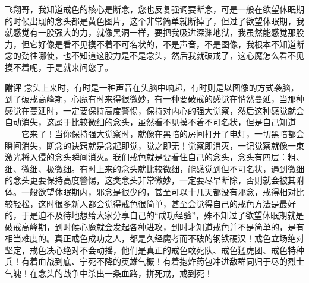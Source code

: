 \begin{case}
    飞翔哥，我知道戒色的核心是断念，您也反复强调要断念，可是一般在欲望休眠期的时候出现的念头都是黄色图片，这个非常简单就断掉了，但过了欲望休眠期，我就感觉有一股强大的力，就像黑洞一样，要把我吸进深渊地狱，我虽然能感觉那股力，但它好像是看不见摸不着不可名状的，不是声音，不是图像，我根本不知道断念的劲往哪使，也不知道这股力是不是念头，然后我就破戒了，这心魔怎么看不见摸不着呢，于是就来问您了。

    \textbf{附评} 念头上来时，有时是一种声音在头脑中响起，有时则是以图像的方式袭脑，到了破戒高峰期，心魔有时来得很微妙，有一种要破戒的感觉在悄然蔓延，当那种感觉在蔓延时，一定要保持高度警惕，保持对内心的强大觉察，然后这种感觉就会自动消失，这属于比较微细的念头，虽然看不见摸不着不可名状，但是自己知道——它来了！当你保持强大觉察时，就像在黑暗的房间打开了电灯，一切黑暗都会瞬间消失，断念的诀窍就是念起即觉，觉之即无！觉察即消灭，一记觉察就像一束激光将入侵的念头瞬间消灭。我们戒色就是要看住自己的念头，念头有四层：粗、细、微细、极微细。有时上来的念头就比较微细，能感觉到但不可名状，遇到微细的念头更要保持高度警惕，这类念头非常微妙，一定要尽早断除，否则就会被其附体。一般欲望休眠期内，邪念是很少的，甚至可以十几天都没有邪念，戒得相对比较轻松，这时很多新人都会觉得戒色很简单，甚至会觉得自己的戒色方法是最好的，于是迫不及待地想给大家分享自己的“成功经验”，殊不知过了欲望休眠期就是破戒高峰期，到时候心魔就会发起各种进攻，到时才知道戒色并不是简单的，是有相当难度的。真正戒色成功之人，都是久经魔考而不破的钢铁硬汉！戒色立场绝对坚定，戒色决心绝对不会动摇，他们是真正的戒色敢死队、戒色猛虎团、戒色特种兵！有着血战到底、宁死不降的英雄气概！有着抱炸药包冲进敌群同归于尽的烈士气魄！在念头的战争中杀出一条血路，拼死戒，戒到死！
\end{case}

